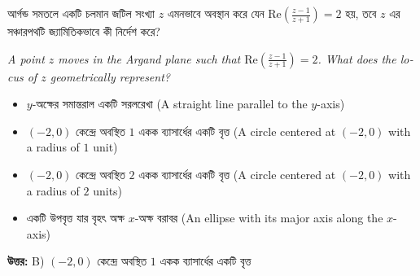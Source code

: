 \documentclass[12pt, a4paper]{article}
\begin{document}
\begin{tcolorbox}[questionbox={প্রশ্ন (Question) 1}]
    \noindent
    আর্গন্ড সমতলে একটি চলমান জটিল সংখ্যা $z$ এমনভাবে অবস্থান করে যেন $\text{Re}\left(\frac{z-1}{z+1}\right) = 2$ হয়, তবে $z$ এর সঞ্চারপথটি জ্যামিতিকভাবে কী নির্দেশ করে?
    
    \vspace{0.8em}
    \begin{english}
    \noindent\textit{\color{darkgray}
    A point $z$ moves in the Argand plane such that $\text{Re}\left(\frac{z-1}{z+1}\right) = 2$. What does the locus of $z$ geometrically represent?
    }
    \end{english}
\end{tcolorbox}

\begin{itemize}[label={}, leftmargin=1cm, itemsep=0.5em]
    \item[\textbf{A)}] $y$-অক্ষের সমান্তরাল একটি সরলরেখা (A straight line parallel to the $y$-axis)
    \item[\textbf{B)}] $(-2, 0)$ কেন্দ্রে অবস্থিত $1$ একক ব্যাসার্ধের একটি বৃত্ত (A circle centered at $(-2, 0)$ with a radius of $1$ unit)
    \item[\textbf{C)}] $(-2, 0)$ কেন্দ্রে অবস্থিত $2$ একক ব্যাসার্ধের একটি বৃত্ত (A circle centered at $(-2, 0)$ with a radius of $2$ units)
    \item[\textbf{D)}] একটি উপবৃত্ত যার বৃহৎ অক্ষ $x$-অক্ষ বরাবর (An ellipse with its major axis along the $x$-axis)
\end{itemize}

\vspace{0.5em}
\begin{tcolorbox}[answerbox]
    \textbf{\color{success} উত্তর:} B) $(-2, 0)$ কেন্দ্রে অবস্থিত $1$ একক ব্যাসার্ধের একটি বৃত্ত
\end{tcolorbox}
\vspace{1em}
\end{document}
